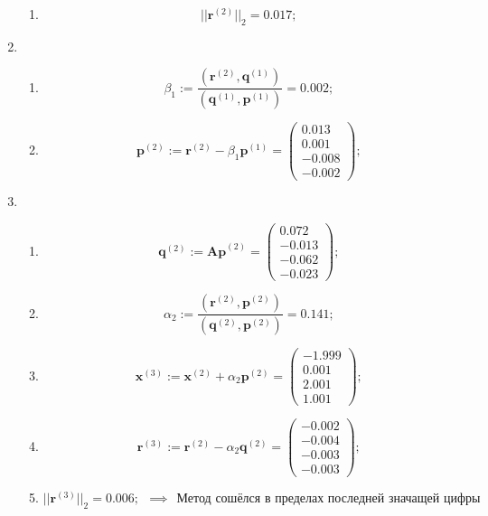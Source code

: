 \begin{enumerate}
\begin{enumerate}
        \item $$||\mathbf{r}^{(2)}||_2 = \mathbf{0.017};$$
    \end{enumerate}

    \item \begin{enumerate}
        \item $$\beta_1 :=
        \dfrac{(\mathbf{r}^{(2)}, \mathbf{q}^{(1)})}{(\mathbf{q}^{(1)}, \mathbf{p}^{(1)})} = 0.002;$$

        \item $$\mathbf{p}^{(2)} :=
        \mathbf{r}^{(2)}-\beta_1\mathbf{p}^{(1)} = \begin{pmatrix} 0.013\\0.001\\-0.008\\-0.002 \end{pmatrix};$$
    \end{enumerate}

    \item \begin{enumerate}
        \item $$\mathbf{q}^{(2)} :=
        \mathbf{Ap}^{(2)} = \begin{pmatrix}0.072\\-0.013\\-0.062\\-0.023\end{pmatrix};$$

        \item $$\alpha_2 :=
        \dfrac{(\mathbf{r}^{(2)}, \mathbf{p}^{(2)})}{(\mathbf{q}^{(2)}, \mathbf{p}^{(2)})} = 0.141;$$

        \item $$\mathbf{x}^{(3)} :=
        \mathbf{x}^{(2)}+\alpha_2\mathbf{p}^{(2)} = \begin{pmatrix}-1.999\\0.001\\2.001\\1.001\end{pmatrix};$$

        \item $$\mathbf{r}^{(3)} :=
        \mathbf{r}^{(2)}-\alpha_2\mathbf{q}^{(2)} = \begin{pmatrix}-0.002\\-0.004\\-0.003\\-0.003 \end{pmatrix};$$

        \item $$||\mathbf{r}^{(3)}||_2 = \mathbf{0.006}; ~~ \implies ~~ \text{Метод сошёлся в пределах последней значащей цифры}$$
    \end{enumerate}
\end{enumerate}



